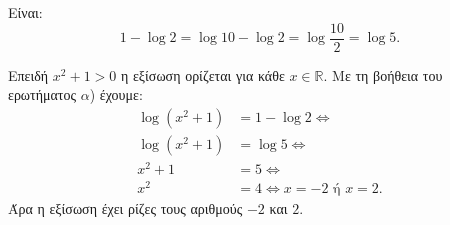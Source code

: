 \begin{alist}
\item Είναι:
\[1 - \log 2 = \log 10 - \log 2 = \log\frac{10}{2} = \log 5.\]
\item Επειδή $x^2 + 1 > 0$ η εξίσωση ορίζεται για κάθε $x \in \mathbb{R}$. Με τη βοήθεια του ερωτήματος $\alpha$) έχουμε:
\begin{align*}
\log(x^2 + 1) &= 1 - \log 2 \Leftrightarrow \\
\log(x^2 + 1) &= \log 5 \Leftrightarrow \\
x^2 + 1 &= 5 \Leftrightarrow \\
x^2 &= 4 \Leftrightarrow x = -2\text{ ή } x = 2.
\end{align*}
Άρα η εξίσωση έχει ρίζες τους αριθμούς $-2$ και $2$.
\end{alist}

